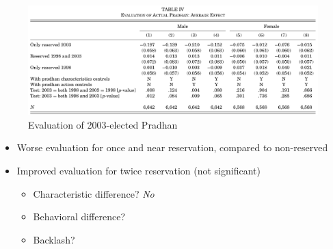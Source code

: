 \documentclass[
  10pt,
  ignorenonframetext,
  aspectratio=43,
]{beamer}
\providecommand{\tightlist}{%
  \setlength{\itemsep}{0pt}\setlength{\parskip}{0pt}}
\begin{document}
\begin{frame}
\begin{figure}
\centering
\includegraphics{20220523-qje-beaman-duflo-powerful-women.assets/table4-evaluation of pradhan.png}
\caption{Evaluation of 2003-elected Pradhan}
\end{figure}

\begin{itemize}
\tightlist
\item
  Worse evaluation for once and near reservation, compared to
  non-reserved
\item
  Improved evaluation for twice reservation (not significant)

  \begin{itemize}
  \tightlist
  \item
    Characteristic difference? \emph{No}
  \item
    Behavioral difference?
  \item
    Backlash?
  \end{itemize}
\end{itemize}
\end{frame}
\end{document}
